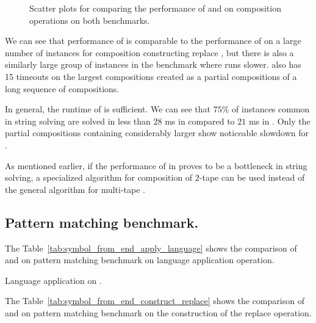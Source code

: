 \begin{figure}[ht]
    \centering
    \quad
    \caption{
      Scatter plots for comparing the performance of \mata and \mona on composition operations on both benchmarks.
    }
    \label{fig:composition}%
\end{figure}

We can see that performance of \mata is comparable to the performance of \mona on a large number of instances for composition constructing replace \nfts, but there is also a similarly large group of instances in the \transducerPlus benchmark where \mata runs slower.
\mata also has 15 timeouts on the largest compositions created as a partial compositions of a long sequence of compositions.

In general, the runtime of \mata is sufficient.
We can see that $75 \%$ of instances common in string solving are solved in less than $28$ ms in \mata compared to $21$ ms in \mona.
Only the partial compositions containing considerably larger \nfts show noticeable slowdown for \mata.

As mentioned earlier, if the performance of \nfts in \mata proves to be a bottleneck in string solving, a specialized algorithm for composition of $2$-tape \nfts can be used instead of the general algorithm for multi-tape \nfts.

\subsection{Pattern matching benchmark.}

The Table~\ref{tab:symbol_from_end_apply_language} shows the comparison of \mata and \mona on pattern matching benchmark \symbolFromEnd on language application operation.

\begin{table}[ht]
  \centering
  
  \caption{
    Language application on \symbolFromEnd.
  }
  \label{tab:symbol_from_end_apply_language}
\end{table}

The Table~\ref{tab:symbol_from_end_construct_replace} shows the comparison of \mata and \mona on pattern matching benchmark \symbolFromEnd on the construction of the replace \nft operation.

